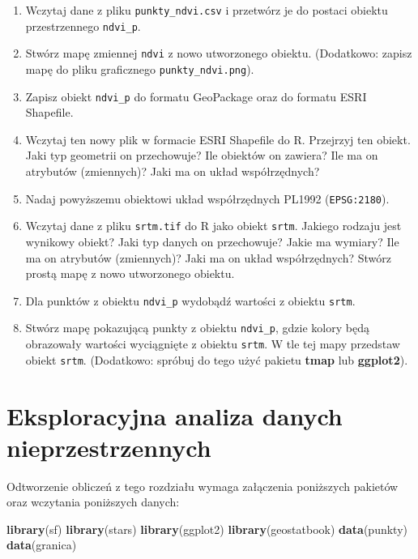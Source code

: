 \documentclass[
  paper=6in:9in,pagesize=pdftex,headinclude=on,footinclude=on,10pt]{scrbook}
\newenvironment{Shaded}{\begin{snugshade}}{\end{snugshade}}
\newcommand{\FunctionTok}[1]{\textcolor[rgb]{0.13,0.29,0.53}{\textbf{#1}}}
\newcommand{\NormalTok}[1]{#1}
\providecommand{\tightlist}{%
  \setlength{\itemsep}{0pt}\setlength{\parskip}{0pt}}
\begin{document}
\begin{enumerate}
\def\labelenumi{\arabic{enumi}.}
\tightlist
\item
  Wczytaj dane z pliku \texttt{punkty\_ndvi.csv} i przetwórz je do postaci obiektu przestrzennego \texttt{ndvi\_p}.
\item
  Stwórz mapę zmiennej \texttt{ndvi} z nowo utworzonego obiektu. (Dodatkowo: zapisz mapę do pliku graficznego \texttt{punkty\_ndvi.png}).
\item
  Zapisz obiekt \texttt{ndvi\_p} do formatu GeoPackage oraz do formatu ESRI Shapefile.
\item
  Wczytaj ten nowy plik w formacie ESRI Shapefile do R.
  Przejrzyj ten obiekt.
  Jaki typ geometrii on przechowuje?
  Ile obiektów on zawiera?
  Ile ma on atrybutów (zmiennych)?
  Jaki ma on układ współrzędnych?
\item
  Nadaj powyższemu obiektowi układ współrzędnych PL1992 (\texttt{EPSG:2180}).
\item
  Wczytaj dane z pliku \texttt{srtm.tif} do R jako obiekt \texttt{srtm}.
  Jakiego rodzaju jest wynikowy obiekt?
  Jaki typ danych on przechowuje?
  Jakie ma wymiary?
  Ile ma on atrybutów (zmiennych)?
  Jaki ma on układ współrzędnych?
  Stwórz prostą mapę z nowo utworzonego obiektu.
\item
  Dla punktów z obiektu \texttt{ndvi\_p} wydobądź wartości z obiektu \texttt{srtm}.
\item
  Stwórz mapę pokazującą punkty z obiektu \texttt{ndvi\_p}, gdzie kolory będą obrazowały wartości wyciągnięte z obiektu \texttt{srtm}.
  W tle tej mapy przedstaw obiekt \texttt{srtm}.
  (Dodatkowo: spróbuj do tego użyć pakietu \textbf{tmap} lub \textbf{ggplot2}).
\end{enumerate}

\chapter{Eksploracyjna analiza danych nieprzestrzennych}\label{eksploracja-analiza-danych-nieprzestrzennych}

Odtworzenie obliczeń z tego rozdziału wymaga załączenia poniższych pakietów oraz wczytania poniższych danych:

\begin{Shaded}
\begin{Highlighting}[]
\FunctionTok{library}\NormalTok{(sf)}
\FunctionTok{library}\NormalTok{(stars)}
\FunctionTok{library}\NormalTok{(ggplot2)}
\FunctionTok{library}\NormalTok{(geostatbook)}
\FunctionTok{data}\NormalTok{(punkty)}
\FunctionTok{data}\NormalTok{(granica)}
\end{Highlighting}
\end{Shaded}
\end{document}
